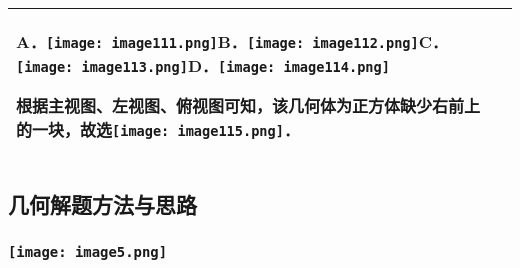 \begin{longtable}[]{@{}ll@{}}
\begin{minipage}[t]{0.47\columnwidth}
A．\texttt{[image: image111.png]}B．\texttt{[image: image112.png]}C．\texttt{[image: image113.png]}D．\texttt{[image: image114.png]}

根据主视图、左视图、俯视图可知，该几何体为正方体缺少右前上的一块，故选\texttt{[image: image115.png]}．\strut
\end{minipage}\tabularnewline
\bottomrule
\end{longtable}

\hypertarget{ux51e0ux4f55ux89e3ux9898ux65b9ux6cd5ux4e0eux601dux8def}{%
\subsection{\texorpdfstring{
几何解题方法与思路}{ 几何解题方法与思路}}\label{ux51e0ux4f55ux89e3ux9898ux65b9ux6cd5ux4e0eux601dux8def}}

\hypertarget{ux5b66ux79d1ux7f51www.zxxk.com--ux6559ux80b2ux8d44ux6e90ux95e8ux6237ux63d0ux4f9bux8bd5ux9898ux8bd5ux5377ux6559ux6848ux8bfeux4ef6ux6559ux5b66ux8bbaux6587ux7d20ux6750ux7b49ux5404ux7c7bux6559ux5b66ux8d44ux6e90ux5e93ux4e0bux8f7dux8fd8ux6709ux5927ux91cfux4e30ux5bccux7684ux6559ux5b66ux8d44ux8baf-24}{%
\subsubsection{\texorpdfstring{\protect\texttt{[image: image5.png]}}{学科网(www.zxxk.com)-\/-教育资源门户，提供试题试卷、教案、课件、教学论文、素材等各类教学资源库下载，还有大量丰富的教学资讯！}}\label{ux5b66ux79d1ux7f51www.zxxk.com--ux6559ux80b2ux8d44ux6e90ux95e8ux6237ux63d0ux4f9bux8bd5ux9898ux8bd5ux5377ux6559ux6848ux8bfeux4ef6ux6559ux5b66ux8bbaux6587ux7d20ux6750ux7b49ux5404ux7c7bux6559ux5b66ux8d44ux6e90ux5e93ux4e0bux8f7dux8fd8ux6709ux5927ux91cfux4e30ux5bccux7684ux6559ux5b66ux8d44ux8baf-24}}

